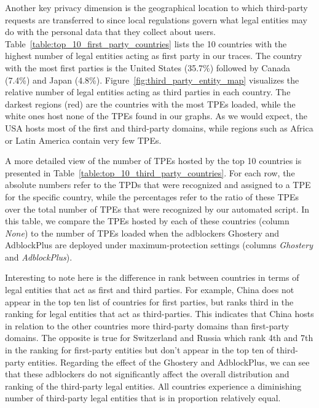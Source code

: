 \documentclass[compsoc, conference, letterpaper, 10pt, times]{IEEEtran}
\begin{document}
Another key privacy dimension is the geographical location to which third-party requests are transferred to since local regulations govern what legal entities may do with the personal data that they collect about users. Table~\ref{table:top_10_first_party_countries} lists the 10 countries with the highest number of legal entities acting as first party in our traces. The country with the most first parties is the United States (35.7\%) followed by Canada (7.4\%) and Japan (4.8\%).  Figure~\ref{fig:third_party_entity_map} visualizes the relative number of legal entities acting as third parties in each country.  The darkest regions (red) are the countries with the most TPEs loaded, while the white ones host none of the TPEs found in our graphs. As we would expect, the USA hosts most of the first and third-party domains, while regions such as Africa or Latin America contain very few TPEs. 

A more detailed view of the number of TPEs hosted by the top 10 countries is presented in Table~\ref{table:top_10_third_party_countries}. For each row, the absolute numbers refer to the TPDs that were recognized and assigned to a TPE for the specific country, while the percentages refer to the ratio of these TPEs over the total number of TPEs that were recognized by our automated script. In this table, we compare the TPEs hosted by each of these countries (column \textit{None}) to the number of TPEs loaded when the adblockers Ghostery and AdblockPlus are deployed under maximum-protection settings (columns \textit{Ghostery} and \textit{AdblockPlus}).

Interesting to note here is the difference in rank between countries in terms of legal entities that act as first and third parties. For example, China does not appear in the top ten list of countries for first parties, but ranks third in the ranking for legal entities that act as third-parties. This indicates that China hosts in relation to the other countries more third-party domains than first-party domains. The opposite is true for Switzerland and Russia which rank 4th and 7th in the ranking for first-party entities but don't appear in the top ten of third-party entities. Regarding the effect of the Ghostery and AdblockPlus, we can see that these adblockers do not significantly affect the overall distribution and ranking of the third-party legal entities. All countries experience a diminishing number of third-party legal entities that is in proportion relatively equal. 

  
\end{document}
